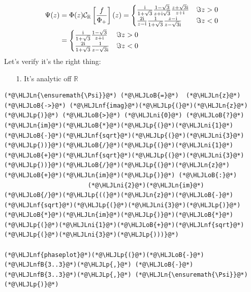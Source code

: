 \documentclass[12pt,a4paper]{article}
\newcommand{\HLJLn}[1]{#1}
\newcommand{\HLJLnf}[1]{\textcolor[RGB]{66,102,213}{#1}}
\newcommand{\HLJLnfB}[1]{\textcolor[RGB]{59,151,46}{#1}}
\newcommand{\HLJLni}[1]{\textcolor[RGB]{59,151,46}{#1}}
\newcommand{\HLJLoB}[1]{\textcolor[RGB]{102,102,102}{\textbf{#1}}}
\newcommand{\HLJLp}[1]{#1}
\def\I{ {\rm i} }
\def\R{ {\mathbb R} }
\def\CC{ {\cal C} }
\def\br[#1]{\left[{#1}\right]}
\begin{document}
\begin{align*}
\Psi(z)  &= \Phi(z) \CC_\R\br[{f \over \Phi_+}](z) = \begin{cases} 
{\I \over 1+\sqrt 3} {1-\sqrt 3 \over z+ \I \sqrt{3}} {z+\sqrt{3}\I \over z+\I} & \Im z > 0 \\
{2 \I \over z-\I}{1 \over 1+ \sqrt{3}} {z-\I \over z-\sqrt{3}\I} & \Im z < 0
\end{cases} \\
    &= \begin{cases} 
{\I \over 1+\sqrt 3} {1-\sqrt 3 \over z+\I} & \Im z > 0 \\
{2 \I  \over 1+ \sqrt{3}} {1 \over z-\sqrt{3}\I} & \Im z < 0
\end{cases}
\end{align*}
Let's verify it's the right thing:

\begin{itemize}
\item[1. ] It's analytic off $\R$

\end{itemize}

\begin{lstlisting}
(*@\HLJLn{\ensuremath{\Psi}}@*) (*@\HLJLoB{=}@*)  (*@\HLJLn{z}@*) (*@\HLJLoB{->}@*) (*@\HLJLnf{imag}@*)(*@\HLJLp{(}@*)(*@\HLJLn{z}@*)(*@\HLJLp{)}@*) (*@\HLJLoB{>}@*) (*@\HLJLni{0}@*) (*@\HLJLoB{?}@*) (*@\HLJLn{im}@*)(*@\HLJLoB{*}@*)(*@\HLJLp{(}@*)(*@\HLJLni{1}@*)(*@\HLJLoB{-}@*)(*@\HLJLnf{sqrt}@*)(*@\HLJLp{(}@*)(*@\HLJLni{3}@*)(*@\HLJLp{))}@*)(*@\HLJLoB{/}@*)(*@\HLJLp{(}@*)(*@\HLJLni{1}@*)(*@\HLJLoB{+}@*)(*@\HLJLnf{sqrt}@*)(*@\HLJLp{(}@*)(*@\HLJLni{3}@*)(*@\HLJLp{))}@*)(*@\HLJLoB{/}@*)(*@\HLJLp{(}@*)(*@\HLJLn{z}@*)(*@\HLJLoB{+}@*)(*@\HLJLn{im}@*)(*@\HLJLp{)}@*) (*@\HLJLoB{:}@*)
                       (*@\HLJLni{2}@*)(*@\HLJLn{im}@*)(*@\HLJLoB{/}@*)(*@\HLJLp{((}@*)(*@\HLJLn{z}@*)(*@\HLJLoB{-}@*)(*@\HLJLnf{sqrt}@*)(*@\HLJLp{(}@*)(*@\HLJLni{3}@*)(*@\HLJLp{)}@*)(*@\HLJLoB{*}@*)(*@\HLJLn{im}@*)(*@\HLJLp{)}@*)(*@\HLJLoB{*}@*)(*@\HLJLp{(}@*)(*@\HLJLni{1}@*)(*@\HLJLoB{+}@*)(*@\HLJLnf{sqrt}@*)(*@\HLJLp{(}@*)(*@\HLJLni{3}@*)(*@\HLJLp{)))}@*)

(*@\HLJLnf{phaseplot}@*)(*@\HLJLp{(}@*)(*@\HLJLoB{-}@*)(*@\HLJLnfB{3..3}@*)(*@\HLJLp{,}@*) (*@\HLJLoB{-}@*)(*@\HLJLnfB{3..3}@*)(*@\HLJLp{,}@*) (*@\HLJLn{\ensuremath{\Psi}}@*)(*@\HLJLp{)}@*)
\end{lstlisting}
\end{document}
